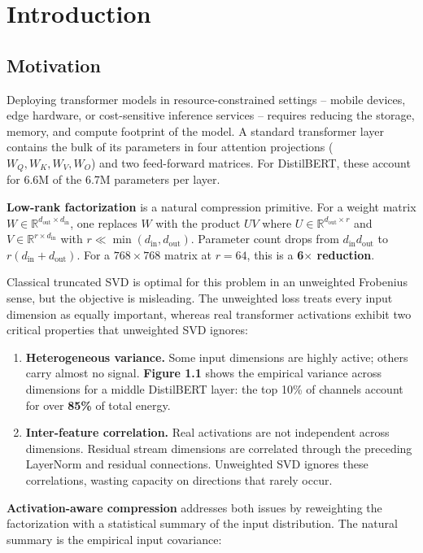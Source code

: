 
\section{Introduction}

\subsection{Motivation}

Deploying transformer models in resource-constrained settings -- mobile 
devices, edge hardware, or cost-sensitive inference services -- requires 
reducing the storage, memory, and compute footprint of the model. A 
standard transformer layer contains the bulk of its parameters in four 
attention projections ($W_Q, W_K, W_V, W_O$) and two feed-forward matrices. 
For DistilBERT, these account for 6.6M of the 6.7M parameters per layer.

\textbf{Low-rank factorization} is a natural compression primitive. For a weight 
matrix $W \in \mathbb{R}^{d_\text{out} \times d_\text{in}}$, one replaces 
$W$ with the product $U V$ where $U \in \mathbb{R}^{d_\text{out} \times r}$ 
and $V \in \mathbb{R}^{r \times d_\text{in}}$ with $r \ll \min(d_\text{in}, d_\text{out})$. 
Parameter count drops from $d_\text{in} d_\text{out}$ to $r(d_\text{in} + d_\text{out})$. 
For a $768 \times 768$ matrix at $r = 64$, this is a \textbf{6$\times$ reduction}.

Classical truncated SVD is optimal for this problem in an unweighted Frobenius 
sense, but the objective is misleading. The unweighted loss treats every 
input dimension as equally important, whereas real transformer activations 
exhibit two critical properties that unweighted SVD ignores:

\begin{enumerate}
\item \textbf{Heterogeneous variance.} Some input dimensions are highly active;
  others carry almost no signal. \textbf{Figure 1.1} shows the empirical variance
  across dimensions for a middle DistilBERT layer: the top 10\% of channels
  account for over \textbf{85\%} of total energy.

\item \textbf{Inter-feature correlation.} Real activations are not independent
  across dimensions. Residual stream dimensions are correlated through the
  preceding LayerNorm and residual connections. Unweighted SVD ignores
  these correlations, wasting capacity on directions that rarely occur.

\end{enumerate}
\textbf{Activation-aware compression} addresses both issues by reweighting the 
factorization with a statistical summary of the input distribution. The 
natural summary is the empirical input covariance:

